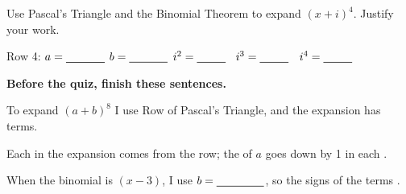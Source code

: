 Use Pascal's Triangle and the Binomial Theorem to expand $(x+i)^4$. Justify your work.

Row 4: \blank[3.2cm] \quad $a=\blank[1.2cm]$ \quad $b=\blank[1.2cm]$ \quad $i^2=\blank[0.9cm]$ \ $i^3=\blank[0.9cm]$ \ $i^4=\blank[0.9cm]$
\lines[4]

\textbf{Before the quiz, finish these sentences.}

To expand $(a+b)^8$ I use Row \blank[1cm] of Pascal's Triangle, and the expansion has \blank[1cm] terms.

Each \blank[2.5cm] in the expansion comes from the row; the \blank[2.5cm] of $a$ goes down by 1 in each \blank[2cm].

When the binomial is $(x-3)$, I use $b=\blank[1.5cm]$, so the signs of the terms \blank[3cm].


